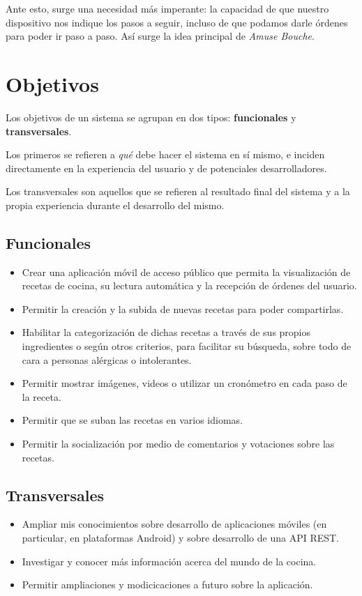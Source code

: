 Ante esto, surge una necesidad más imperante: la capacidad de que nuestro
dispositivo nos indique los pasos a seguir, incluso de que podamos darle
órdenes para poder ir paso a paso. Así surge la idea principal de
\textit{Amuse Bouche}.


\section{Objetivos}
\label{sec:objetivos}

Los objetivos de un sistema se agrupan en dos tipos: \textbf{funcionales} y
\textbf{transversales}.

Los primeros se refieren a \textit{qué} debe hacer el sistema en sí mismo,
e inciden directamente en la experiencia del usuario y de potenciales
desarrolladores.

Los transversales son aquellos que se refieren al resultado final del sistema
y a la propia experiencia durante el desarrollo del mismo.

\subsection{Funcionales}
\begin{itemize}
\item Crear una aplicación móvil de acceso público que permita la visualización
  de recetas de cocina, su lectura automática y la recepción de órdenes del
  usuario.
\item Permitir la creación y la subida de nuevas recetas para poder compartirlas.
\item Habilitar la categorización de dichas recetas a través de sus propios
  ingredientes o según otros criterios, para facilitar su búsqueda, sobre todo
  de cara a personas alérgicas o intolerantes.
\item Permitir mostrar imágenes, videos o utilizar un cronómetro en cada paso
  de la receta.
\item Permitir que se suban las recetas en varios idiomas.
\item Permitir la socialización por medio de comentarios y votaciones sobre las
  recetas.
\end{itemize}


\subsection{Transversales}
\begin{itemize}
\item Ampliar mis conocimientos sobre desarrollo de aplicaciones móviles (en
  particular, en plataformas Android) y sobre desarrollo de una API REST.
\item Investigar y conocer más información acerca del mundo de la cocina.
\item Permitir ampliaciones y modicicaciones a futuro sobre la aplicación.
\end{itemize}


